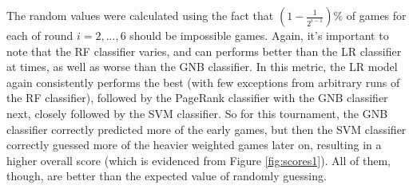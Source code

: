 The random values were calculated using the fact that $\left(1-\frac{1}{2^{i-1}}\right)\%$ of games for each of round $i=2,...,6$ should be impossible games.  
Again, it's important to note that the RF classifier varies, and can performs better than the LR classifier at times, as well as worse than the GNB classifier.  
In this metric, the LR model again consistently performs the best (with few exceptions from arbitrary runs of the RF classifier), followed by the PageRank classifier with the GNB classifier next, closely followed by the SVM classifier.  
So for this tournament, the GNB classifier correctly predicted more of the early games, but then the SVM  classifier correctly guessed more of the heavier weighted games later on, resulting in a higher overall score (which is evidenced from Figure \ref{fig:scores1}).  
All of them, though, are better than the expected value of randomly guessing.  